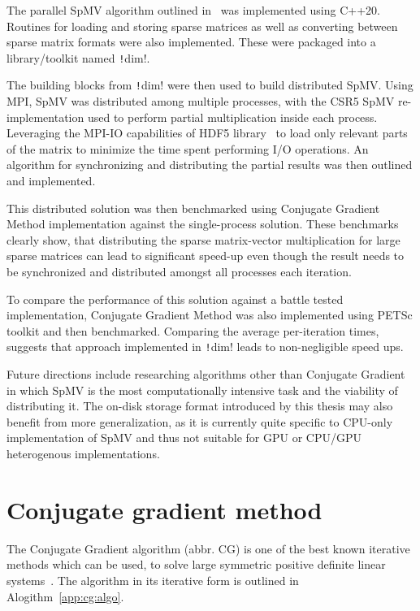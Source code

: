 \documentclass[thesis=M,english]{FITthesis}[2019/12/23]
\newcommand{\csre}[1]{\texttt!#1!}
\begin{document}
The parallel SpMV algorithm outlined in~\cite{liu2015csr5} was implemented using C++20. Routines for
loading and storing sparse matrices as well as converting between sparse matrix formats were
also implemented. These were packaged into a library/toolkit named \csre{dim}.

The building blocks from \csre{dim} were then used to build distributed SpMV\@. Using MPI, SpMV was
distributed among multiple processes, with the CSR5 SpMV re-implementation used to perform partial
multiplication inside each process. Leveraging the MPI-IO capabilities of HDF5 library~\cite{hdf5} to load only
relevant parts of the matrix to minimize the time spent performing I/O operations. An algorithm for
synchronizing and distributing the partial results was then outlined and implemented.

This distributed solution was then benchmarked using Conjugate Gradient Method implementation against the
single-process solution. These benchmarks clearly show, that distributing the sparse matrix-vector multiplication
for large sparse matrices can lead to significant speed-up even though the result needs to be synchronized
and distributed amongst all processes each iteration.

To compare the performance of this solution against a battle tested implementation, Conjugate Gradient Method
was also implemented using PETSc toolkit and then benchmarked. Comparing the average per-iteration times,
suggests that approach implemented in \csre{dim} leads to non-negligible speed ups.

Future directions include researching algorithms other than Conjugate Gradient in which SpMV is the
most computationally intensive task and the viability of distributing it. The on-disk storage format
introduced by this thesis may also benefit from more generalization, as it is currently quite specific to
CPU-only implementation of SpMV and thus not suitable for GPU or CPU/GPU heterogenous implementations.





\appendix


\chapter{Conjugate gradient method}\label{app:cg}

The Conjugate Gradient algorithm (abbr. CG) is one of the best known iterative methods which can be used, to solve large
symmetric positive definite linear systems~\cite{saad03:IMS}. The algorithm in its iterative form is outlined
in Alogithm~\ref{app:cg:algo}.
\end{document}
